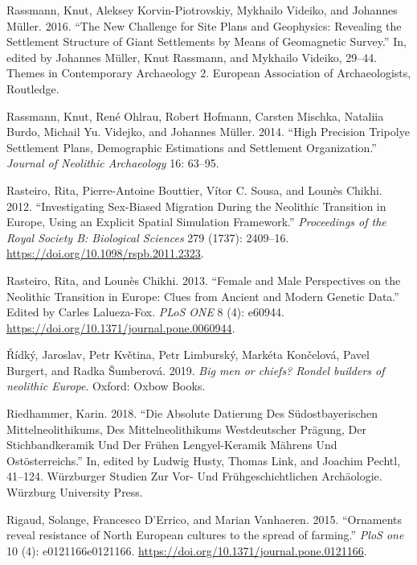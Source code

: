 \documentclass[
  12pt,
  a4paper, twoside]{book}
\newlength{\cslhangindent}
\newlength{\cslentryspacingunit} %
\newenvironment{CSLReferences}[2] %
 {%
  \setlength{\parindent}{0pt}
  \ifodd #1
  \let\oldpar\par
  \def\par{\hangindent=\cslhangindent\oldpar}
  \fi
  \setlength{\parskip}{#2\cslentryspacingunit}
 }%
 {}
\begin{document}
\begin{CSLReferences}{1}{0}
\leavevmode{}%
Rassmann, Knut, Aleksey Korvin-Piotrovskiy, Mykhailo Videiko, and Johannes Müller. 2016. {``The New Challenge for Site Plans and Geophysics: Revealing the Settlement Structure of Giant Settlements by Means of Geomagnetic Survey.''} In, edited by Johannes Müller, Knut Rassmann, and Mykhailo Videiko, 29--44. Themes in Contemporary Archaeology 2. European Association of Archaeologists, Routledge.

\leavevmode{}%
Rassmann, Knut, René Ohlrau, Robert Hofmann, Carsten Mischka, Nataliia Burdo, Michail Yu. Videjko, and Johannes Müller. 2014. {``High Precision Tripolye Settlement Plans, Demographic Estimations and Settlement Organization.''} \emph{Journal of Neolithic Archaeology} 16: 63--95.

\leavevmode{}%
Rasteiro, Rita, Pierre-Antoine Bouttier, Vítor C. Sousa, and Lounès Chikhi. 2012. {``Investigating Sex-Biased Migration During the Neolithic Transition in Europe, Using an Explicit Spatial Simulation Framework.''} \emph{Proceedings of the Royal Society B: Biological Sciences} 279 (1737): 2409--16. \url{https://doi.org/10.1098/rspb.2011.2323}.

\leavevmode{}%
Rasteiro, Rita, and Lounès Chikhi. 2013. {``Female and Male Perspectives on the Neolithic Transition in Europe: Clues from Ancient and Modern Genetic Data.''} Edited by Carles Lalueza-Fox. \emph{PLoS ONE} 8 (4): e60944. \url{https://doi.org/10.1371/journal.pone.0060944}.

\leavevmode{}%
Řídký, Jaroslav, Petr Květina, Petr Limburský, Markéta Končelová, Pavel Burgert, and Radka Šumberová. 2019. \emph{Big men or chiefs? Rondel builders of neolithic Europe}. Oxford: Oxbow Books.

\leavevmode{}%
Riedhammer, Karin. 2018. {``Die Absolute Datierung Des Südostbayerischen Mittelneolithikums, Des Mittelneolithikums Westdeutscher Prägung, Der Stichbandkeramik Und Der Frühen Lengyel-Keramik Mährens Und Ostösterreichs.''} In, edited by Ludwig Husty, Thomas Link, and Joachim Pechtl, 41--124. Würzburger Studien Zur Vor- Und Frühgeschichtlichen Archäologie. Würzburg University Press.

\leavevmode{}%
Rigaud, Solange, Francesco D'Errico, and Marian Vanhaeren. 2015. {``Ornaments reveal resistance of North European cultures to the spread of farming.''} \emph{PloS one} 10 (4): e0121166e0121166. \url{https://doi.org/10.1371/journal.pone.0121166}.


\end{CSLReferences}
\end{document}
